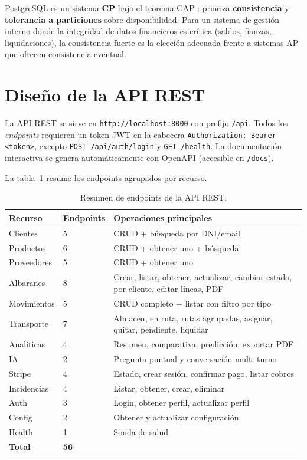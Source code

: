 \documentclass[12pt,twoside,titlepage]{report}
\begin{document}
PostgreSQL es un sistema \textbf{CP} bajo el teorema CAP \cite{brewer2000}: prioriza \textbf{consistencia} y \textbf{tolerancia a particiones} sobre disponibilidad. Para un sistema de gestión interno donde la integridad de datos financieros es crítica (saldos, fianzas, liquidaciones), la consistencia fuerte es la elección adecuada frente a sistemas AP que ofrecen consistencia eventual.


\section{Diseño de la API REST}

La API REST se sirve en \texttt{http://localhost:8000} con prefijo \texttt{/api}. Todos los \emph{endpoints} requieren un token JWT en la cabecera \texttt{Authorization: Bearer <token>}, excepto \texttt{POST /api/auth/login} y \texttt{GET /health}. La documentación interactiva se genera automáticamente con OpenAPI (accesible en \texttt{/docs}).

La tabla~\ref{tab:endpoints} resume los endpoints agrupados por recurso.

\begin{table}[H]
  \centering
  \caption{Resumen de endpoints de la API REST.}
  \label{tab:endpoints}
  \begin{tabularx}{\textwidth}{llX}
    \toprule
    \textbf{Recurso} & \textbf{Endpoints} & \textbf{Operaciones principales} \\
    \midrule
    Clientes       & 5 & CRUD + búsqueda por DNI/email \\
    Productos      & 6 & CRUD + obtener uno + búsqueda \\
    Proveedores    & 5 & CRUD + obtener uno \\
    Albaranes      & 8 & Crear, listar, obtener, actualizar, cambiar estado, por cliente, editar líneas, PDF \\
    Movimientos    & 5 & CRUD completo + listar con filtro por tipo \\
    Transporte     & 7 & Almacén, en ruta, rutas agrupadas, asignar, quitar, pendiente, liquidar \\
    Analíticas     & 4 & Resumen, comparativa, predicción, exportar PDF \\
    IA             & 2 & Pregunta puntual y conversación multi-turno \\
    Stripe         & 4 & Estado, crear sesión, confirmar pago, listar cobros \\
    Incidencias    & 4 & Listar, obtener, crear, eliminar \\
    Auth           & 3 & Login, obtener perfil, actualizar perfil \\
    Config         & 2 & Obtener y actualizar configuración \\
    Health         & 1 & Sonda de salud \\
    \midrule
    \textbf{Total} & \textbf{56} & \\
    \bottomrule
  \end{tabularx}
\end{table}
\end{document}
